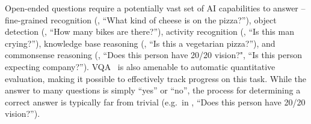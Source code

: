 Open-ended questions require a potentially vast
set of AI capabilities to answer --
fine-grained recognition (\eg, ``What kind of cheese is on the pizza?''),
object detection (\eg, ``How many bikes are there?''),
activity recognition (\eg, ``Is this man crying?''),
knowledge base reasoning (\eg, ``Is this a vegetarian pizza?''),
and commonsense reasoning (\eg, ``Does this person have 20/20 vision?", ``Is this person expecting company?'').
VQA~\cite{geman,fritz,SongChun_video_queries,vizwiz} is also amenable to automatic quantitative evaluation, making it possible to effectively track progress on this task.
While the answer to many questions is simply ``yes'' or ``no'', the process for determining a correct answer is typically far from trivial (e.g.~in , ``Does this person have 20/20 vision?'').
